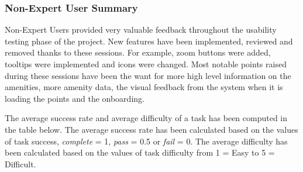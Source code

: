 \subsubsection{Non-Expert User Summary}
Non-Expert Users provided very valuable feedback throughout the usability testing
phase of the project. New features have been implemented, reviewed and removed
thanks to these sessions.
For example, zoom buttons were added, tooltips were implemented and icons were
changed. Most notable points raised during these sessions have been the want for
more high level information on the amenities, more amenity data, the visual
feedback from the system when it is loading the points and the onboarding.

The average success rate and average difficulty of a task has been computed in
the table below. The average success rate has been calculated based on the
values of task success, \emph{complete} = 1, \emph{pass} = 0.5 or \emph{fail} =
0.
The average difficulty has been calculated based on the values of task
difficulty from 1 = Easy to 5 = Difficult.

